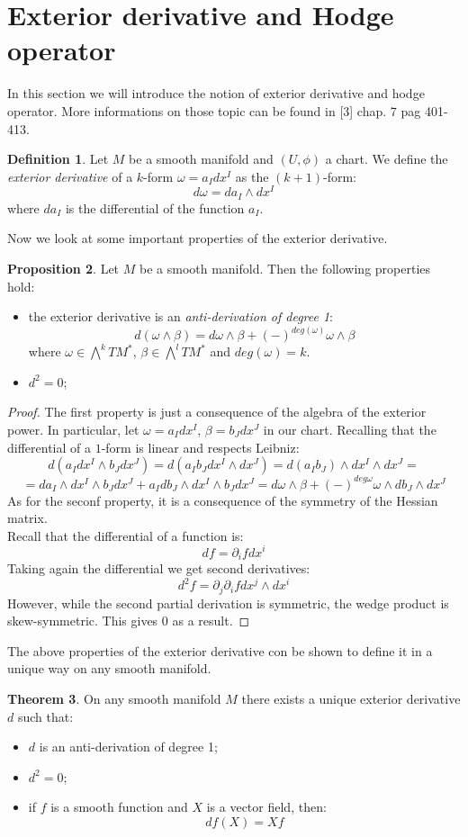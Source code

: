 \documentclass[12pt,a4paper]{report}
\theoremstyle{definition}
\newtheorem{Def}{Definition}[chapter]
\theoremstyle{Theorem}
\newtheorem{Theo}[Def]{Theorem}
\newtheorem{Prop}[Def]{Proposition}
\theoremstyle{definition}
\theoremstyle{definition}
\begin{document}
	\section{Exterior derivative and Hodge operator}\label{Sec_1.7}
	In this section we will introduce the notion of exterior derivative and hodge operator. More informations on those topic can be found in [3] chap. 7 pag 401-413.
	\begin{Def}
		Let $M$ be a smooth manifold and $(U,\phi)$ a chart. We define the \textit{exterior derivative} of a $k$-form $\omega=a_Idx^I$ as the $(k+1)$-form:
		$$d\omega=da_I\wedge dx^I$$
		where $da_I$ is the differential of the function $a_I$.
	\end{Def}
	Now we look at some important properties of the exterior derivative.
	\begin{Prop}
		Let $M$ be a smooth manifold. Then the following properties hold:
		\begin{itemize}
			\item the exterior derivative is an \textit{anti-derivation of degree 1}: $$d(\omega\wedge\beta)=d\omega\wedge\beta+(-)^{deg(\omega)}\omega\wedge\beta$$
			where $\omega\in \bigwedge^k TM^*$, $\beta\in \bigwedge^l TM^*$ and $deg(\omega)=k$.
			\item $d^2=0$;
		\end{itemize}
	\end{Prop}
	\begin{proof}
		The first property is just a consequence of the algebra of the exterior power. In particular, let $\omega=a_Idx^I$, $\beta=b_Jdx^J$ in our chart. Recalling that the differential of a $1$-form is linear and respects Leibniz:
		$$d(a_Idx^I\wedge b_Jdx^J)=d(a_Ib_Jdx^I\wedge dx^J)=d(a_Ib_J)\wedge dx^I\wedge dx^J=$$
		$$=da_I\wedge dx^I\wedge b_Jdx^J+a_Idb_J\wedge dx^I\wedge b_Jdx^J=d\omega\wedge\beta+(-)^{deg\omega}\omega\wedge db_J\wedge dx^J$$
		As for the seconf property, it is a consequence of the symmetry of the Hessian matrix.\\
		Recall that the differential of a function is:
		$$df=\partial_ifdx^i$$
		Taking again the differential we get second derivatives:
		$$d^2f=\partial_j\partial_i f dx^j\wedge dx^i$$
		However, while the second partial derivation is symmetric, the wedge product is skew-symmetric. This gives 0 as a result.
	\end{proof}
	The above properties of the exterior derivative con be shown to define it in a unique way on any smooth manifold.
	\begin{Theo}
		On any smooth manifold $M$ there exists a unique exterior derivative $d$ such that:
		\begin{itemize}
			\item $d$ is an anti-derivation of degree 1;
			\item $d^2=0$;
			\item if $f$ is a smooth function and $X$ is a vector field, then:
			$$df(X)=Xf$$
		\end{itemize}
	\end{Theo}
\end{document}
